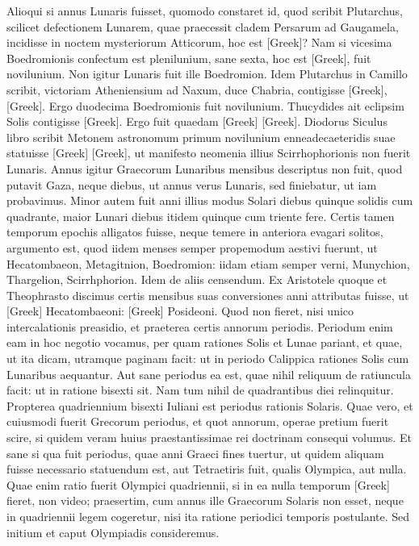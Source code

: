Alioqui si annus Lunaris fuisset, quomodo constaret
id, quod scribit Plutarchus, scilicet defectionem Lunarem, quae
praecessit cladem Persarum ad Gaugamela, incidisse in noctem mysteriorum
Atticorum, hoc est \textgreek{[Greek]}?
Nam si vicesima Boedromionis
confectum est plenilunium, sane sexta, hoc est \textgreek{[Greek]},
fuit novilunium.
Non igitur Lunaris fuit ille Boedromion.
Idem Plutarchus
in Camillo scribit, victoriam Atheniensium ad Naxum, duce
Chabria, contigisse \textgreek{[Greek]}, \textgreek{[Greek]}.
Ergo
duodecima Boedromionis fuit novilunium.
Thucydides ait eclipsim
Solis contigisse \textgreek{[Greek]}.
Ergo fuit quaedam \textgreek{[Greek]}
\textgreek{[Greek]}.
Diodorus Siculus libro  scribit Metonem astronomum
primum novilunium enneadecaeteridis suae statuisse \textgreek{[Greek]}
\textgreek{[Greek]}, ut manifesto neomenia illius Scirrhophorionis non fuerit
Lunaris.
Annus igitur Graecorum Lunaribus mensibus descriptus non
fuit, quod putavit Gaza, neque  diebus,
 ut annus verus Lunaris,
sed  finiebatur, ut iam probavimus.
Minor autem fuit
anni illius modus Solari diebus quinque solidis cum quadrante, maior
Lunari diebus itidem quinque cum triente fere.
Certis tamen temporum
epochis alligatos fuisse, neque temere in anteriora evagari solitos,
argumento est, quod iidem menses semper propemodum aestivi
fuerunt, ut Hecatombaeon, Metagitnion, Boedromion: iidam etiam
semper verni, Munychion, Thargelion, Scirrhphorion.
Idem de aliis censendum.
Ex Aristotele quoque et Theophrasto discimus
certis mensibus suas conversiones anni attributas fuisse,
 ut \textgreek{[Greek]}
Hecatombaeoni: \textgreek{[Greek]} Posideoni.
Quod non fieret, nisi unico
intercalationis preasidio, et praeterea certis annorum periodis.
Periodum
enim eam in hoc negotio vocamus, per quam rationes Solis
et Lunae pariant, et quae, ut ita dicam, utramque paginam facit: ut in
periodo Calippica rationes Solis cum Lunaribus aequantur.
Aut sane
periodus ea est, quae nihil reliquum de ratiuncula facit: ut in ratione
bisexti sit.
Nam tum nihil de quadrantibus diei relinquitur.
Propterea
quadriennium bisexti Iuliani est periodus rationis Solaris.
Quae vero, et cuiusmodi fuerit Grecorum periodus, et quot annorum,
operae pretium fuerit scire, si quidem veram huius praestantissimae rei
doctrinam consequi volumus.
Et sane si qua fuit periodus, quae anni
Graeci fines tuertur, ut quidem aliquam fuisse necessario statuendum
est, aut Tetraetiris fuit, qualis Olympica, aut nulla.
Quae enim ratio
fuerit Olympici quadriennii, si in ea nulla temporum
 \textgreek{[Greek]} fieret,
non video;
praesertim, cum annus ille Graecorum Solaris non esset,
neque in quadriennii legem cogeretur, nisi ita ratione periodici temporis
postulante.
Sed initium et caput Olympiadis consideremus.

